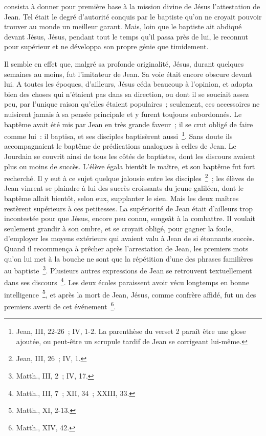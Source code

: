 \documentclass[french,twoside]{book} %
\begin{document}
consista à donner pour première base à la mission divine de Jésus l’attestation de Jean. Tel était le degré d’autorité conquis par le baptiste qu’on ne croyait pouvoir trouver au monde un meilleur garant. Mais, loin que le baptiste ait abdiqué devant Jésus, Jésus, pendant tout le temps qu’il passa près de lui, le reconnut pour supérieur et ne développa son propre génie que timidement.\par
Il semble en effet que, malgré sa profonde originalité, Jésus, durant quelques semaines au moins, fut l’imitateur de Jean. Sa voie était encore obscure devant lui. A toutes les époques, d’ailleurs, Jésus céda beaucoup à l’opinion, et adopta bien des choses qui n’étaient pas dans sa direction, ou dont il se souciait assez peu, par l’unique raison qu’elles étaient populaires ; seulement, ces accessoires ne nuisirent jamais à sa pensée principale et y furent toujours subordonnés. Le baptême avait été mis par Jean en très grande faveur ; il se crut obligé de faire comme lui : il baptisa, et ses disciples baptisèrent aussi \footnote{Jean, III, 22-26 ; IV, 1-2. La parenthèse du verset 2 paraît être une glose ajoutée, ou peut-être un scrupule tardif de Jean se corrigeant lui-même.}. Sans doute ils accompagnaient le baptême de prédications analogues à celles de Jean. Le Jourdain se couvrit ainsi de tous les côtés de baptistes, dont les discours avaient plus ou moins de succès. L’élève égala bientôt le maître, et son baptême fut fort recherché. Il y eut à ce sujet quelque jalousie entre les disciples \footnote{Jean, III, 26 ; IV, 1.} ; les élèves de Jean vinrent se plaindre à lui des succès croissants du jeune galiléen, dont le baptême allait bientôt, selon eux, supplanter le sien. Mais les deux maîtres restèrent supérieurs à ces petitesses. La supériorité de Jean était d’ailleurs trop incontestée pour que Jésus, encore peu connu, songeât à la combattre. Il voulait seulement grandir à son ombre, et se croyait obligé, pour gagner la foule, d’employer les moyens extérieurs qui avaient valu à Jean de si étonnants succès. Quand il recommença à prêcher après l’arrestation de Jean, les premiers mots qu’on lui met à la bouche ne sont que la répétition d’une des phrases familières au baptiste \footnote{Matth., III, 2 ; IV, 17.}. Plusieurs autres expressions de Jean se retrouvent textuellement dans ses discours \footnote{Matth., III, 7 ; XII, 34 ; XXIII, 33.}. Les deux écoles paraissent avoir vécu longtemps en bonne intelligence \footnote{Matth., XI, 2-13.}, et après la mort de Jean, Jésus, comme confrère affidé, fut un des premiers averti de cet événement \footnote{Matth., XIV, 42.}.\par
\end{document}
